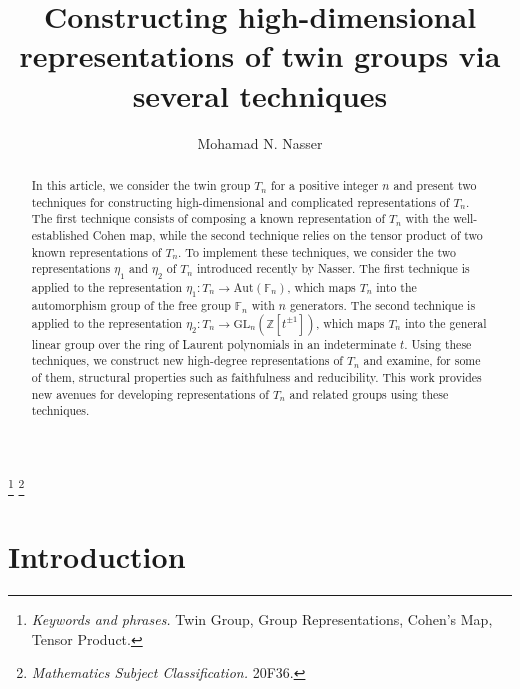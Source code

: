 \documentclass[reqno]{amsart}
\begin{document}
\title[High-dimensional representations of $T_n$ via several techniques]{Constructing high-dimensional representations of twin groups via several techniques}

\author{Mohamad N. Nasser}         
\address{Mohamad N. Nasser\\
         Department of Mathematics and Computer Science\\
         Beirut Arab University\\
         P.O. Box 11-5020, Beirut, Lebanon}

\maketitle
 
\begin{abstract}
In this article, we consider the twin group $T_n$ for a positive integer $n$ and present two techniques for constructing high-dimensional and complicated representations of $T_n$. The first technique consists of composing a known representation of $T_n$ with the well-established Cohen map, while the second technique relies on the tensor product of two known representations of $T_n$. To implement these techniques, we consider the two representations $\eta_1$ and $\eta_2$ of $T_n$ introduced recently by Nasser. The first technique is applied to the representation $\eta_1: T_n \longrightarrow \mathrm{Aut}(\mathbb{F}_n)$, which maps $T_n$ into the automorphism group of the free group $\mathbb{F}_n$ with $n$ generators. The second technique is applied to the representation $\eta_2: T_n \longrightarrow \mathrm{GL}_n(\mathbb{Z}[t^{\pm 1}])$, which maps $T_n$ into the general linear group over the ring of Laurent polynomials in an indeterminate $t$. Using these techniques, we construct new high-degree representations of $T_n$ and examine, for some of them, structural properties such as faithfulness and reducibility. This work provides new avenues for developing representations of $T_n$ and related groups using these techniques.
\end{abstract}

\renewcommand{\thefootnote}{}
\footnote{\textit{Keywords and phrases.} Twin Group, Group Representations, Cohen's Map, Tensor Product.}
\footnote{\textit{Mathematics Subject Classification.} 20F36.}

\vspace{0.5cm}

\section{Introduction}
\end{document}
